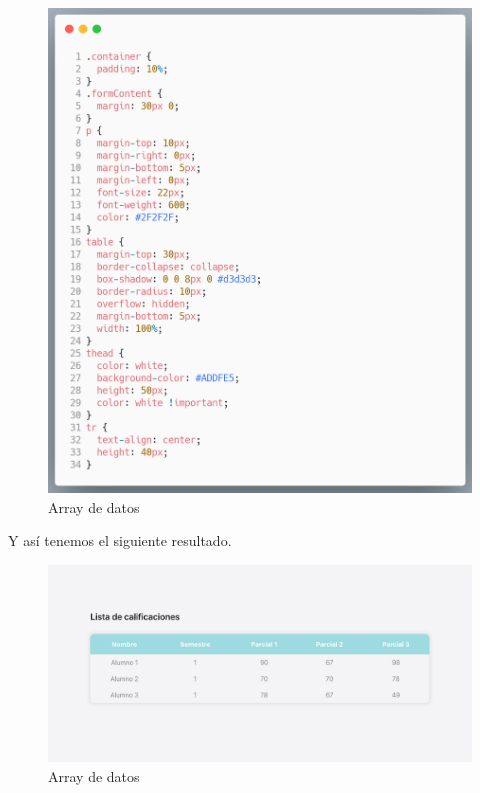  \newline
     \begin{figure}[H]
    \includegraphics[width=1\textwidth]{./Imagenes/table-css.png}
     \caption[Crear nuevos directorios]{Array de datos}
         \end{figure}
    \newline
    
    Y así tenemos el siguiente resultado.
    
     \newline
     \begin{figure}[H]
    \includegraphics[width=1\textwidth]{./Imagenes/table-res.png}
     \caption[Crear nuevos directorios]{Array de datos}
         \end{figure}
    \newline
    
